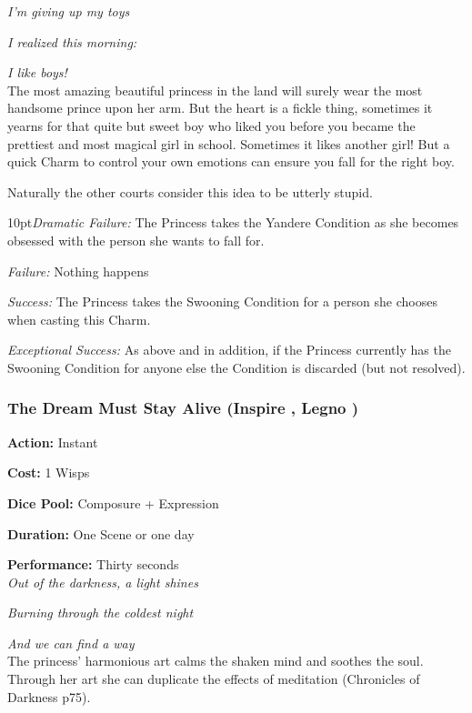 \textit{I'm giving up my toys}

\textit{I realized this morning:}

\textit{I like boys!} \\

\noindent The most amazing beautiful princess in the land will surely wear the most handsome prince upon her arm. But the heart is a fickle thing, sometimes it yearns for that quite but sweet boy who liked you before you became the prettiest and most magical girl in school. Sometimes it likes another girl! But a quick Charm to control your own emotions can ensure you fall for the right boy. 

Naturally the other courts consider this idea to be utterly stupid. 

\begin{myindentpar}{10pt}\emph{Dramatic Failure:} The Princess takes the Yandere Condition as she becomes obsessed with the person she wants to fall for. 
 
 \emph{Failure:} Nothing happens
 
 \emph{Success:} The Princess takes the Swooning Condition for a person she chooses when casting this Charm.
 
 \emph{Exceptional Success:} As above and in addition, if the Princess currently has the Swooning Condition for anyone else the Condition is discarded (but not resolved).
 \end{myindentpar}

 \subsubsection*{The Dream Must Stay Alive (Inspire \textbullet, Legno \textbullet)}

\noindent \textbf{Action:} Instant

\noindent \textbf{Cost:} 1 Wisps

\noindent \textbf{Dice Pool:} Composure + Expression

\noindent \textbf{Duration:} One Scene or one day

\noindent \textbf{Performance:} Thirty seconds \\

\noindent \textit{Out of the darkness, a light shines}

\textit{Burning through the coldest night}

\textit{And we can find a way} \\

\noindent The princess' harmonious art calms the shaken mind and soothes the soul. Through her art she can duplicate the effects of meditation (Chronicles of Darkness p75).  

